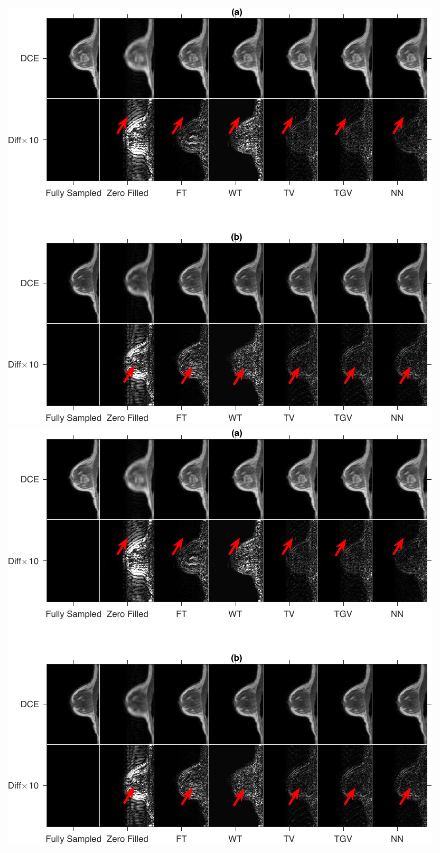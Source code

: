 \documentclass{beamer}
\begin{document}
\begin{frame}
	\begin{figure}
	\begin{minipage}[t]{0.75\linewidth}
		\centering
		\includegraphics[width=1\textwidth]{001.pdf}
	\end{minipage}
	\begin{minipage}[t]{0.75\linewidth}
		\centering
		\includegraphics[width=1\textwidth]{105.pdf}
	\end{minipage}
	\end{figure}
\end{frame}
\end{document}
